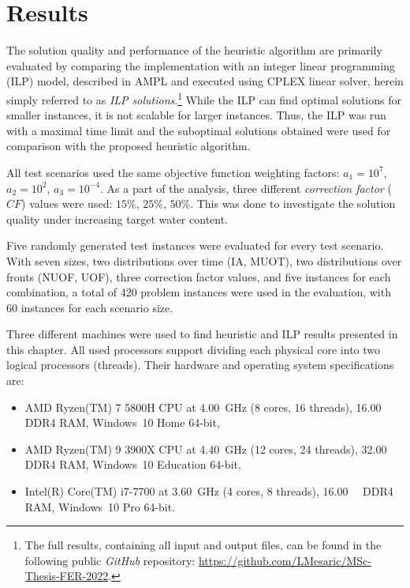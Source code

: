 \chapter{Results}

The solution quality and performance of the heuristic algorithm are primarily evaluated by comparing the implementation with an integer linear programming (ILP) model, described in AMPL and executed using CPLEX linear solver, herein simply referred to as \textit{ILP solutions}.\footnote{The full results, containing all input and output files, can be found in the following public \textit{GitHub} repository: \url{https://github.com/LMesaric/MSc-Thesis-FER-2022}.}
While the ILP can find optimal solutions for smaller instances, it is not scalable for larger instances.
Thus, the ILP was run with a maximal time limit and the suboptimal solutions obtained were used for comparison with the proposed heuristic algorithm.

All test scenarios used the same objective function weighting factors: $a_1 = 10^7$, $a_2 = 10^2$, $a_3 = 10^{-4}$.
As a part of the analysis, three different \textit{correction factor} ($\mathit{CF}$) values were used: $15\%$, $25\%$, $50\%$.
This was done to investigate the solution quality under increasing target water content.

Five randomly generated test instances were evaluated for every test scenario.
With seven sizes, two distributions over time (IA, MUOT), two distributions over fronts (NUOF, UOF), three correction factor values, and five instances for each combination, a total of 420 problem instances were used in the evaluation, with 60 instances for each scenario size.

Three different machines were used to find heuristic and ILP results presented in this chapter.
All used processors support dividing each physical core into two logical processors (threads).
Their hardware and operating system specifications are:
\begin{itemize}
    \item AMD Ryzen(TM) 7 5800H CPU at \SI{4.00}{\GHz} (8 cores, 16 threads),  \SI{16.00}{\giga\byte} DDR4 RAM, Windows~10 Home 64-bit,
    \item AMD Ryzen(TM) 9 3900X CPU at \SI{4.40}{\GHz} (12 cores, 24 threads), \SI{32.00}{\giga\byte} DDR4 RAM, Windows~10 Education 64-bit,
    \item Intel(R) Core(TM) i7-7700 at \SI{3.60}{\GHz} (4 cores, 8 threads),   \SI{16.00}{\giga\byte} DDR4 RAM, Windows~10 Pro 64-bit.
\end{itemize}


